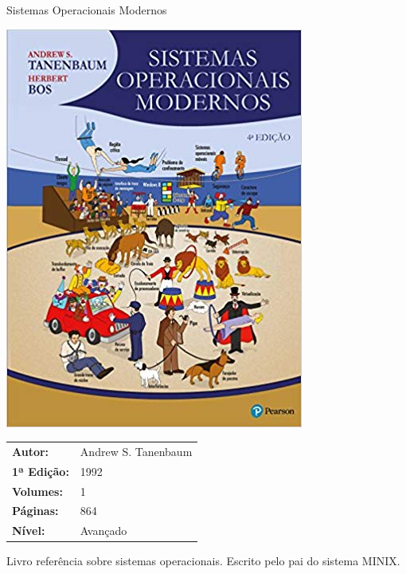 \begin{frame}[fragile]{Sistemas Operacionais Modernos}

    \begin{minipage}{0.35\textwidth}
        \includegraphics[scale=0.25]{so.jpg}
    \end{minipage}
    \begin{minipage}{0.55\textwidth}
        \begin{small}
            \begin{tabularx}{0.95\textwidth}{lX}
                \textbf{Autor:} & Andrew S. Tanenbaum \\
                \textbf{1ª Edição:} & 1992 \\
                \textbf{Volumes:} & 1 \\
                \textbf{Páginas:} & 864 \\
                \textbf{Nível:} & Avançado \\
            \end{tabularx}
        \end{small}
    \end{minipage}

    \vspace{0.2in} 

    Livro referência sobre sistemas operacionais. Escrito pelo pai do sistema MINIX.

\end{frame}

